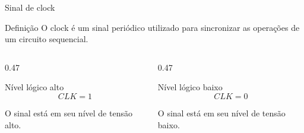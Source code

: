 \begin{frame}{Sinal de clock}

    \begin{block}{Definição}
        O clock é um sinal periódico utilizado para sincronizar as
        operações de um circuito sequencial.
    \end{block}

    \begin{columns}[T]

        \begin{column}{0.47\textwidth}
            \begin{alertblock}{Nível lógico alto}
                \[
                    CLK = 1
                \]

                O sinal está em seu nível de tensão alto.
            \end{alertblock}
        \end{column}

        \begin{column}{0.47\textwidth}
            \begin{block}{Nível lógico baixo}
                \[
                    CLK = 0
                \]

                O sinal está em seu nível de tensão baixo.
            \end{block}
        \end{column}

    \end{columns}

\end{frame}
